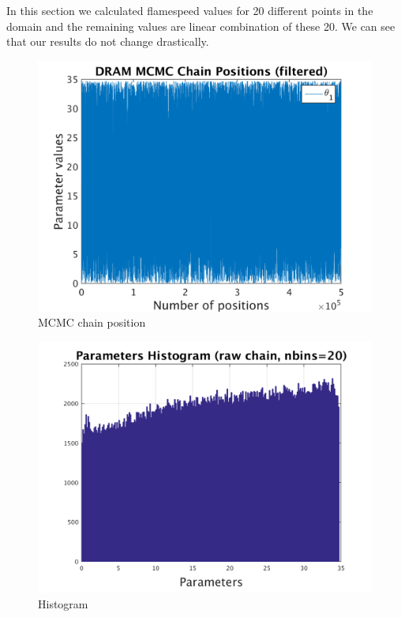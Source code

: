 In this section we calculated flamespeed values for 20 different points in the domain and the remaining values are linear combination of these 20. We can see that our results do not change drastically. 

\begin{figure}[h!]
  
  \centering
   \includegraphics[scale=0.75]{output_20/simple_ip_chain_pos_filt}
   \caption{MCMC chain position }
\end{figure}


\begin{figure}[h!]
  
  \centering
   \includegraphics[scale=0.75]{output_20/simple_ip_hist_raw}
   \caption{Histogram}
\end{figure}



